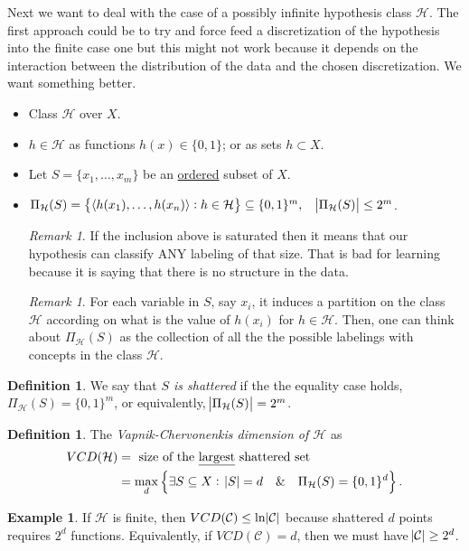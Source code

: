 \documentclass[12pt, letterpaper]{article}
\numberwithin{equation}{section} %
\newcommand{\ul}{\underline}
\newcommand{\mc}{\mathcal}
\theoremstyle{definition}
\newtheorem{definition}[theorem]{Definition}
\newtheorem{example}[theorem]{Example}
\theoremstyle{remark}
\newtheorem{remark}[theorem]{Remark}
\begin{document}
Next we want to deal with the case of a possibly infinite hypothesis class $\mc H$. The first approach could be to try and force feed a discretization of the hypothesis into the finite case one but this might not work because it depends on the interaction between the distribution of the data and the chosen discretization. We want something better.

\begin{itemize}
    \item Class $\mc H$ over $X$.
    \item $h\in \mc H$ as functions $h(x)\in \lbrace0,1\rbrace$; or as sets $h\subset X$.
    \item Let $S=\lbrace x_1,\ldots,x_m\rbrace$ be an \ul{ordered} subset of $X$.
    \item $\Pi_{\mc H}(S) = \left\{\langle h(x_1),\ldots,h(x_n)\rangle:h\in\mc H\right\} \subseteq \lbrace0,1\rbrace^m,\quad\abs{\Pi_{\mc H}(S)}\leq 2^m$.
    \begin{remark}
        If the inclusion above is saturated then it means that our hypothesis can classify ANY labeling of that size. That is bad for learning because it is saying that there is no structure in the data.
    \end{remark}
    \begin{remark}
        For each variable in $S$, say $x_i$, it induces a partition on the class $\mc H$ according on what is the value of $h(x_i)$ for $h \in \mc H$. Then, one can think about $\Pi_{\mc H}(S)$ as the collection of all the the possible labelings with concepts in the class $\mc H$.
    \end{remark}
\end{itemize}
\begin{definition}
    We say that \emph{$S$ is shattered} if the the equality case holds, $\Pi_{\mc H}(S) = \lbrace 0, 1\rbrace^m$, or equivalently, $\abs{\Pi_{\mc H}(S)} = 2^m$.
\end{definition}
\begin{definition}
    The \emph{Vapnik-Chervonenkis dimension of $\mc H$} as
    \begin{align}
        VCD(\mc H) &= \textrm{ size of the \ul{largest} shattered set}\\
        &= \max\limits_d\left\{\exists S\subseteq X:\;\abs{S}=d\quad\&\quad\Pi_{\mc H}(S) = \lbrace 0,1\rbrace^d\right\}.
    \end{align}
\end{definition}

\begin{example}
    If $\mc H$ is finite, then $VCD(\mc C)\leq \ln\abs{\mc C}$ because shattered $d$ points requires $2^d$ functions. Equivalently, if $VCD(\mc C) = d$, then we must have $\abs{\mc C} \geq 2^d$.
\end{example}
\end{document}
